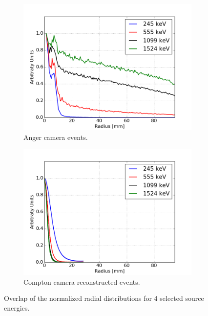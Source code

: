 \begin{figure}
\begin{subfigure}{.5\textwidth}
\centering
  \includegraphics[width=\linewidth]{03_GraphicFiles/chapter5_SPECTsimu/SPECT/anger/radial_distribution_overlap}
  \caption{Anger camera events.}
  \label{chap5::fig::rad_distr_overlap_CA}
\end{subfigure}
\begin{subfigure}{.5\textwidth}
\centering
  \includegraphics[width=\linewidth]{03_GraphicFiles/chapter5_SPECTsimu/SPECT/compton/radial_distribution_overlap_sel}
  \caption{Compton camera reconstructed events.}
  \label{chap5::fig::rad_distr_overlap_CC}
\end{subfigure}
\caption{Overlap of the normalized radial distributions for 4 selected source energies.}
\label{chap5::fig::rad_distr_overlap}
\end{figure} 
               

